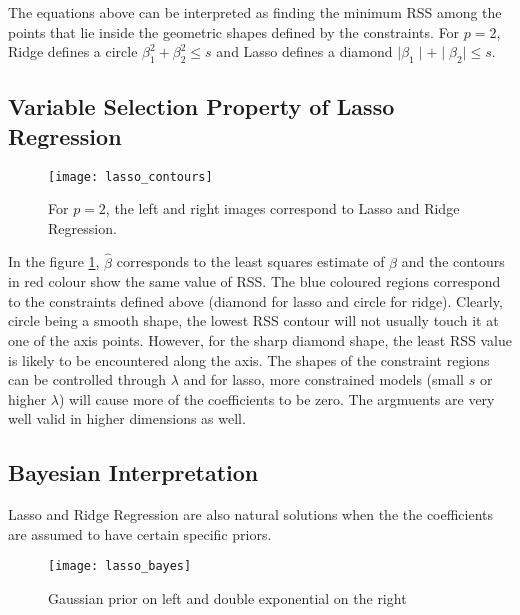 \documentclass[../statistical_learning_notes.tex]{subfiles}
\begin{document}
    The equations above can be interpreted as finding the minimum RSS among the points that lie inside the geometric shapes defined by the constraints. For $p = 2$, Ridge defines a circle $\beta_{1}^{2} + \beta_{2}^{2} \leq s$ and Lasso defines a diamond $\mid \beta_{1} \mid + \mid \beta_{2} \mid \leq s$.

    
    \subsection{Variable Selection Property of Lasso Regression}
    \begin{figure}[h]
    \texttt{[image: lasso\_contours]}
    \centering
    \caption{For $p=2$, the left and right images correspond to Lasso and Ridge Regression.}
    \label{fig:lasso_contour} %
    \end{figure}

    In the figure \ref{fig:lasso_contour}, $\hat{\beta}$ corresponds to the least squares estimate of $\beta$ and the contours in red colour show the same value of RSS. The blue coloured regions correspond to the constraints defined above (diamond for lasso and circle for ridge).\newline
    Clearly, circle being a smooth shape, the lowest RSS contour will not usually touch it at one of the axis points. However, for the sharp diamond shape, the least RSS value is likely to be encountered along the axis. The shapes of the constraint regions can be controlled through $\lambda$ and for lasso, more constrained models (small $s$ or higher $\lambda$) will cause more of the coefficients to be zero. The argmuents are very well valid in higher dimensions as well.

    
    \subsection{Bayesian Interpretation}
    Lasso and Ridge Regression are also natural solutions when the the coefficients are assumed to have certain specific priors.\newline
    \begin{figure}[h]
        \texttt{[image: lasso\_bayes]}
        \centering
        \caption {Gaussian prior on left and double exponential on the right}
        \label{fig:lasso_bayes}
    \end{figure}
    
\end{document}
